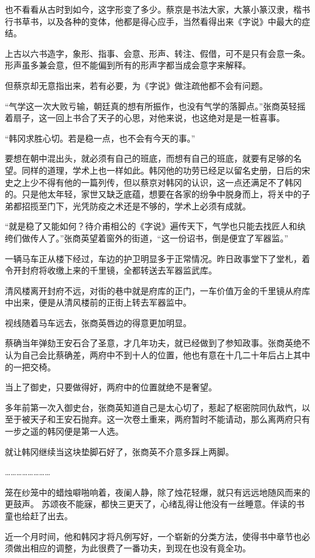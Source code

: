 也不看看从古时到如今，这字形变了多少。蔡京是书法大家，大篆小篆汉隶，楷书行书草书，以及各种的变体，他都是得心应手，当然看得出来《字说》中最大的症结。

上古以六书造字，象形、指事、会意、形声、转注、假借，可不是只有会意一条。形声虽多兼会意，但不能偏到所有的形声字都当成会意字来解释。

但蔡京却无意指出来，若有必要，为《字说》做注疏他都不会有问题。

“气学这一次大败亏输，朝廷真的想有所振作，也没有气学的落脚点。”张商英轻摇着扇子，这一回上书合了天子的心思，对他来说，也这绝对是是一桩喜事。

“韩冈求胜心切。若是稳一点，也不会有今天的事。”

要想在朝中混出头，就必须有自己的班底，而想有自己的班底，就要有足够的名望。同样的道理，学术上也一样如此。韩冈他的功劳已经足以留名史册，日后的宋史之上少不得有他的一篇列传，但以蔡京对韩冈的认识，这一点还满足不了韩冈的。只是他太年轻，家世又缺乏底蕴，想要在各家的纷争中脱身而上，将关中的子弟都招揽至门下，光凭防疫之术还是不够的，学术上必须有成就。

“就是稳了又能如何？待介甫相公的《字说》遍传天下，气学也只能去找匠人和纨绔们做传人了。”张商英望着窗外的街道，“这一份诏书，倒是便宜了军器监。”

一辆马车正从楼下经过，车边的护卫明显多于正常情况。昨日政事堂下了堂札，着令开封府将收缴上来的千里镜，全都转送去军器监武库。

清风楼离开封府不远，对街的巷中就是府库的正门，一车价值万金的千里镜从府库中出来，便是从清风楼前的正街上转去军器监中。

视线随着马车远去，张商英唇边的得意更加明显。

蔡确当年弹劾王安石合了圣意，才几年功夫，就已经做到了参知政事。张商英绝不认为自己会比蔡确差，两府中不到十人的位置，他也有意在十几二十年后占上其中的一把交椅。

当上了御史，只要做得好，两府中的位置就绝不是奢望。

多年前第一次入御史台，张商英知道自己是太心切了，惹起了枢密院同仇敌忾，以至于被天子和王安石抛弃。这一次卷土重来，两府暂时不能请动，那么离两府只有一步之遥的韩冈便是第一人选。

就让韩冈继续当这块垫脚石好了，张商英不介意多踩上两脚。

……………………

笼在纱笼中的蜡烛噼啪响着，夜阑人静，除了烛花轻爆，就只有远远地随风而来的更鼓声。
苏颂夜不能寐，都快三更天了，心绪乱得让他没有一丝睡意。伴读的书童也给赶了出去。

近一个月时间，他和韩冈才将凡例写好，一个崭新的分类方法，使得书中章节也必须做出相应的调整，为此很费了一番功夫，到现在也没有竟全功。

